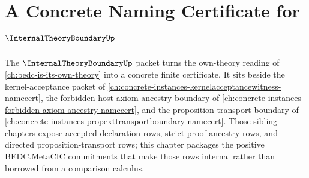 \chapter{A Concrete Naming Certificate for $\InternalTheoryBoundaryUp$}
\label{ch:concrete-instances-internaltheoryboundary-namecert}

The $\InternalTheoryBoundaryUp$ packet turns the own-theory reading of \autoref{ch:bedc-is-its-own-theory} into a concrete finite certificate. It sits beside the kernel-acceptance packet of \autoref{ch:concrete-instances-kernelacceptancewitness-namecert}, the forbidden-host-axiom ancestry boundary of \autoref{ch:concrete-instances-forbidden-axiom-ancestry-namecert}, and the proposition-transport boundary of \autoref{ch:concrete-instances-propexttransportboundary-namecert}. Those sibling chapters expose accepted-declaration rows, strict proof-ancestry rows, and directed proposition-transport rows; this chapter packages the positive BEDC.MetaCIC commitments that make those rows internal rather than borrowed from a comparison calculus.

